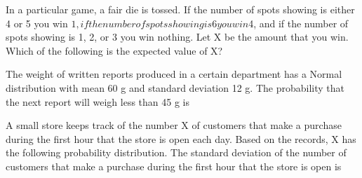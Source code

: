 \documentclass[letterpaper,12pt,addpoints]{exam}
\begin{document}
\clearpage
\begin{questions}
\question
 In a particular game, a fair die is tossed.  If the number of spots showing is either 4 or 5 you win $1, if the number of spots showing is 6 you win $4, and if the number of spots showing is 1, 2, or 3 you win nothing.  Let X be the amount that you win. 
Which of the following is the expected value of X?


\clearpage
\question
 The weight of written reports produced in a certain department has a Normal distribution with mean 60 g and standard deviation 12 g. The probability that the next report will weigh less than 45 g is


\clearpage
\question A small store keeps track of the number X of customers that make a purchase during the first hour that the store is open each day.  Based on the records, X has the following probability distribution.
The standard deviation of the number of customers that make a purchase during the first hour that the store is open is
\begin{parts}

\end{parts}
\end{questions}
\end{document}
